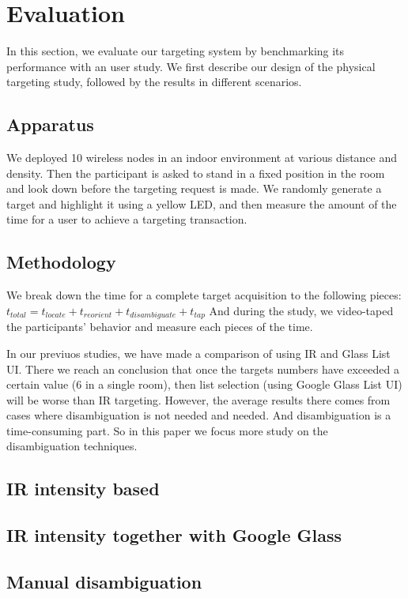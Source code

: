 \section{Evaluation}
\label{sec:evaluation}

In this section, we evaluate our targeting system by benchmarking its performance with an user study. We first describe our design of the physical targeting study, followed by the results in different scenarios.

\subsection{Apparatus}
We deployed 10 wireless nodes in an indoor environment at various distance and density. Then the participant is asked to stand in a fixed position in the room and look down before the targeting request is made. We randomly generate a target and highlight it using a yellow LED, and then measure the amount of the time for a user to achieve a targeting transaction. 

\subsection{Methodology}
\label{sec:methodology}

We break down the time for a complete target acquisition to the following pieces:
$t_{total}=t_{locate}+t_{reorient}+t_{disambiguate}+t_{tap}$
And during the study, we video-taped the participants' behavior and measure each pieces of the time. 

In our previuos studies, we have made a comparison of using IR and Glass List UI. There we reach an conclusion that once the targets numbers have exceeded a certain value (6 in a single room), then list selection (using Google Glass List UI) will be worse than IR targeting. However, the average results there comes from cases where disambiguation is not needed and needed. And disambiguation is a time-consuming part. So in this paper we focus more study on the disambiguation techniques.

\subsection{IR intensity based}

\subsection{IR intensity together with Google Glass}

\subsection{Manual disambiguation}



